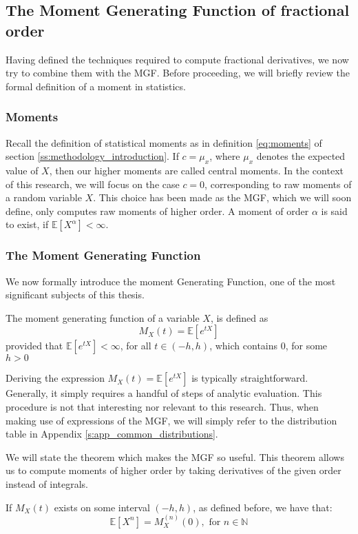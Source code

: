 \subsection{The Moment Generating Function of fractional order}\label{s:MGF}
Having defined the techniques required to compute fractional derivatives, we now try to combine them with the MGF. Before proceeding, we will briefly review the formal definition of a moment in statistics.
\subsubsection{Moments}
Recall the definition of statistical moments as in definition \ref{eq:moments} of section \ref{ss:methodology_introduction}. If \(c = \mu_x\), where \(\mu_x\) denotes the expected value of \(X\), then our higher moments are called central moments. In the context of this research, we will focus on the case \(c = 0\), corresponding to raw moments of a random variable \(X\). This choice has been made as the MGF, which we will soon define, only computes raw moments of higher order. A moment of order \(\alpha\) is said to exist, if \(\mathbb{E}[X^\alpha] < \infty\).

\subsubsection{The Moment Generating Function}
We now formally introduce the moment Generating Function, one of the most significant subjects of this thesis.
\begin{definition}
    The moment generating function of a variable \(X\), is defined as
    \[M_X(t) = \mathbb{E}[e^{tX}]\] provided that \(\mathbb{E}[e^{tX}] < \infty\), for all  \( t \in (- h, h)\), which contains 0, for some \(h > 0\) 
\end{definition}

\begin{remark}
    Deriving the expression \(M_X(t) = \mathbb{E}[e^{tX}]\) is typically straightforward. Generally, it simply requires a handful of steps of analytic evaluation. This procedure is not that interesting nor relevant to this research. Thus, when making use of  expressions of the MGF, we will simply refer to the distribution table in Appendix \ref{s:app_common_distributions}.
\end{remark}

 
We will state the theorem which makes the MGF so useful. This theorem allows us to compute moments of higher order by taking derivatives of the given order instead of integrals.
\begin{theorem}\label{t:mgf}
    If \(M_X(t)\) exists on some interval \((-h, h)\), as defined before, we have that:
    \[ \mathbb{E}[X^n] = M_X^{(n)}(0), \text{ for } n \in \mathbb{N}\] 
\end{theorem} 




